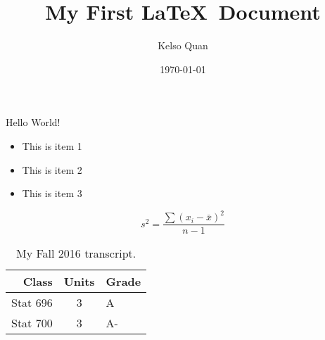 \documentclass[11pt]{article}
\title{My First \LaTeX\ Document}
\author{Kelso Quan}
\date{\today}
\begin{document}
\maketitle
Hello World!

\begin{itemize}
\item This is item 1
\item This is item 2
\item This is item 3
\end{itemize}

\begin{equation}
\label{sample_variance}
s^2 = \frac{\sum (x_i - \bar{x})^2}{n-1}
\end{equation}

\begin{table}
\caption{My Fall 2016 transcript.}
\label{transcript}
\begin{center}
\begin{tabular}{|r|c|l|} \hline
Class & Units & Grade \\ \hline
Stat 696 & 3 & A \\ \hline
Stat 700 & 3 & A- \\ \hline
\end{tabular}
\end{center}
\end{table}
\end{document}
